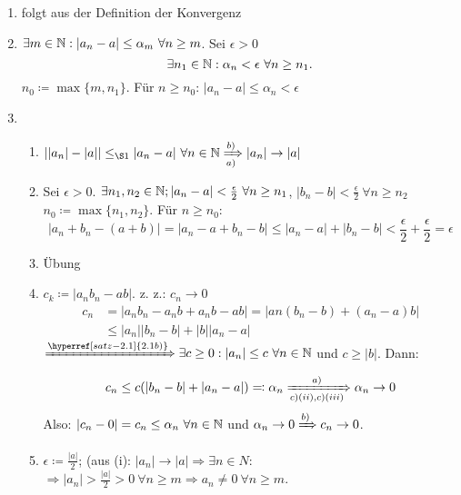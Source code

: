 \begin{beweis}[von 2.2]
	\begin{enumerate}
		\item folgt aus der Definition der Konvergenz
		\item $\exists m \in \mathbb{N}: |a_{n} - a | \leq \alpha_{m} ~\forall n \geq m$. Sei $\epsilon > 0$
			$$
		 		\exists n_{1} \in \mathbb{N}: \alpha_{n} < \epsilon ~\forall n \geq n_{1}.
		 	$$
		 	$n_{0} \coloneqq \max \{ m , n_{1} \}$. Für $n \geq n_{0}$: $|a_{n} - a| \leq \alpha_{n} < \epsilon$
		\item \begin{enumerate}
				\item $| |a_{n}| - |a|| \leq_{\S 1} |a_{n} - a| ~\forall n \in \N \xRightarrow[a)]{b)} |a_{n}| \rightarrow |a|$
				\item Sei $\epsilon > 0$. $\exists n_{1}, n_{2} \in \mathbb{N}; |a_{n} - a| < \frac{\epsilon}{2} ~\forall n \geq n_{1}$, $|b_{n} - b| < \frac{\epsilon}{2} ~\forall n \geq n_{2}$ \\
					$n_{0} \coloneqq \max \{ n_{1}, n_{2} \}$. Für $n \geq n_{0}$:
					$$
						|a_{n} + b_{n} - (a + b)| = |a_{n} - a + b_{n} - b| \leq |a_{n} - a| + |b_{n} - b| < \frac{\epsilon}{2} + \frac{\epsilon}{2} = \epsilon
					$$
				\item Übung
				\item $c_{k} \coloneqq |a_{n} b_{n} - ab|$. z. z.: $c_{n} \rightarrow 0$
					\begin{align*}
						c_{n} & = |a_{n}b_{n} - a_{n}b + a_{n}b - ab| = |a{n}(b_{n} - b)+ (a_{n} - a)b| \\
							  & \leq |a_{n}||b_{n} - b| + |b||a_{n}-a|
					\end{align*}
					$\xRightarrow[]{\hyperref[satz-2.1]{2.1 b)}} \exists c \geq 0 : |a_{n}| \leq c ~\forall n \in \N$ und $c \geq |b|$. Dann:
					$$
						c_{n} \leq c(|b_{n}-b| + |a_{n}-a|) \eqqcolon \alpha_{n} \xRightarrow[c) (ii), c) (iii)]{a)} \alpha_{n} \rightarrow 0
					$$
					Also: $|c_{n} - 0| = c_{n} \leq \alpha_{n} ~\forall n \in \mathbb{N}$ und $\alpha_{n} \rightarrow 0 \xRightarrow[]{b)} c_{n} \rightarrow 0$.
				\item $\epsilon \coloneqq \frac{|a|}{2}$; (aus (i): $|a_{n}| \rightarrow |a| \Rightarrow \exists n \in N$:
					$$
					$$
					$\Rightarrow |a_{n}| > \frac{|a|}{2} > 0 ~\forall n \geq m \Rightarrow a_{n} \neq 0 ~\forall n \geq m$.
			  \end{enumerate}
	\end{enumerate}	
\end{beweis}
